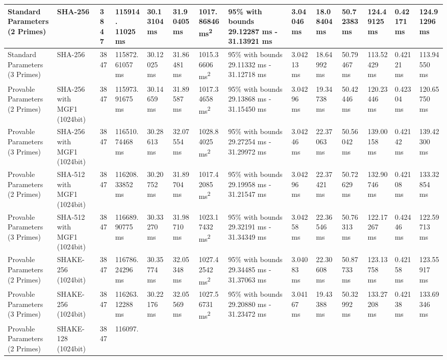 \documentclass[]{final_report}
\theoremstyle{definition}
\begin{document}
\begin{landscape}
\begin{longtable}{|p{2.3cm}|p{1.8cm}|p{1.0cm}|p{1.7cm}|p{1.2cm}|p{1.5cm}|p{1.8cm}|p{1.5cm}|p{1.2cm}|p{1.5cm}|p{1.3cm}|p{1.4cm}|p{1.3cm}|p{1.5cm}|}
Standard Parameters (2 Primes) & SHA-256 & 3847 & 115914.
11025 ms & 30.13104 ms & 31.90405 ms & 1017.86846 ms\textsuperscript{2} & 95\% with bounds 29.12287 ms - 31.13921 ms & 3.04046 ms & 18.08404 ms & 50.72383 ms & 124.49125 ms & 0.42171 ms & 124.91296 ms \\
\hline
Standard Parameters (3 Primes) & SHA-256 & 3847 & 115872.
61057 ms & 30.12025 ms & 31.86481 ms & 1015.36606 ms\textsuperscript{2} & 95\% with bounds 29.11332 ms - 31.12718 ms & 3.04213 ms & 18.64992 ms & 50.79467 ms & 113.52429 ms & 0.42121 ms & 113.94550 ms \\
\hline
Provable Parameters (2 Primes) & SHA-256 with MGF1 (1024bit) & 3847 & 115973.
91675 ms & 30.14659 ms & 31.89587 ms & 1017.34658 ms\textsuperscript{2} & 95\% with bounds 29.13868 ms - 31.15450 ms & 3.04296 ms & 19.34738 ms & 50.42446 ms & 120.23446 ms & 0.42304 ms & 120.65750 ms \\
\hline
Provable Parameters (3 Primes) & SHA-256 with MGF1 (1024bit) & 3847 & 116510.
74468 ms & 30.28613 ms & 32.07554 ms & 1028.84025 ms\textsuperscript{2} & 95\% with bounds 29.27254 ms - 31.29972 ms & 3.04246 ms & 22.37063 ms & 50.56042 ms & 139.00158 ms & 0.42142 ms & 139.42300 ms \\
\hline
Provable Parameters (2 Primes) & SHA-512 with MGF1 (1024bit) & 3847 & 116208.
33852 ms & 30.20752 ms & 31.89704 ms & 1017.42085 ms\textsuperscript{2} & 95\% with bounds 29.19958 ms - 31.21547 ms & 3.04296 ms & 22.37421 ms & 50.72629 ms & 132.90746 ms & 0.42108 ms & 133.32854 ms \\
\hline
Provable Parameters (3 Primes) & SHA-512 with MGF1 (1024bit) & 3847 & 116689.
90775 ms & 30.33270 ms & 31.98710 ms & 1023.17432 ms\textsuperscript{2} & 95\% with bounds 29.32191 ms - 31.34349 ms & 3.04258 ms & 22.36546 ms & 50.76313 ms & 122.17267 ms & 0.42446 ms & 122.59713 ms \\
\hline
Provable Parameters (2 Primes) & SHAKE-256 (1024bit) & 3847 & 116786.
24296 ms & 30.35774 ms & 32.05348 ms & 1027.42542 ms\textsuperscript{2} & 95\% with bounds 29.34485 ms - 31.37063 ms & 3.04083 ms & 22.30608 ms & 50.87733 ms & 123.13758 ms & 0.42158 ms & 123.55917 ms \\
\hline
Provable Parameters (3 Primes) & SHAKE-256 (1024bit) & 3847 & 116263.
12288 ms & 30.22176 ms & 32.05569 ms & 1027.56731 ms\textsuperscript{2} & 95\% with bounds 29.20880 ms - 31.23472 ms & 3.04167 ms & 19.43388 ms & 50.32992 ms & 133.27208 ms & 0.42138 ms & 133.69346 ms \\
\hline
Provable Parameters (2 Primes) & SHAKE-128 (1024bit) & 3847 & 116097.

\end{longtable}
\end{landscape}
\end{document}
